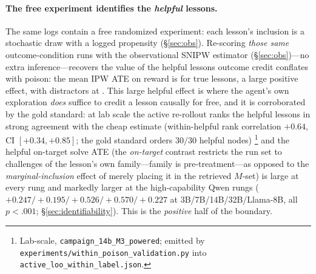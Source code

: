 \paragraph{The free experiment identifies the \emph{helpful} lessons.} The same logs
contain a free randomized experiment: each lesson's inclusion is a stochastic draw with
a logged propensity (\S\ref{sec:obs}). Re-scoring \emph{those same} outcome-condition
runs with the observational SNIPW estimator (\S\ref{sec:obs})---no extra inference---recovers
the value of the helpful lessons outcome credit conflates with poison: the mean IPW ATE
on reward is \ObsAteTrue{} for true lessons, a large positive effect, with distractors
at \ObsAteDistract{}. This large helpful effect is where the agent's own exploration
\emph{does} suffice to credit a lesson causally for free, and it is corroborated by the
gold standard: at lab scale the active re-rollout ranks the helpful lessons in strong
agreement with the cheap estimate (within-helpful rank correlation $+0.64$, CI
$[+0.34,+0.85]$; the gold
standard orders $30/30$ helpful nodes)%
\footnote{Lab-scale, \texttt{campaign\_14b\_M3\_powered}; emitted by
\texttt{experiments/within\_poison\_validation.py} into \texttt{active\_loo\_within\_label.json}.}
and the helpful on-target solve ATE (the \emph{on-target} contrast restricts the run
set to challenges of the lesson's own family---family is pre-treatment---as opposed to the
\emph{marginal-inclusion} effect of merely placing it in the retrieved $M$-set) is large at every rung and markedly larger at the
high-capability Qwen rungs
($+0.247/{+}0.195/{+}0.526/{+}0.570/{+}0.227$ at 3B/7B/14B/32B/Llama-8B, all $p<.001$;
\S\ref{sec:identifiability}). This is the \emph{positive} half of the boundary.

